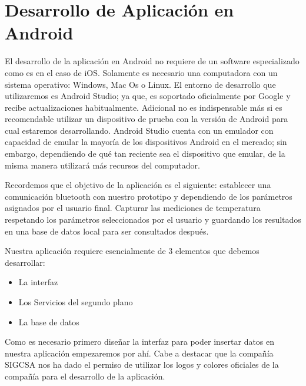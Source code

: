 \section{Desarrollo de Aplicación en Android}

\par 
El desarrollo de la aplicación en Android no requiere de un software especializado como es en el caso de iOS. Solamente es necesario una computadora con un sistema operativo: Windows, Mac Os o Linux. El entorno de desarrollo que utilizaremos es Android Studio; ya que, es soportado oficialmente por Google y recibe actualizaciones habitualmente. Adicional no es indispensable más si es recomendable utilizar un dispositivo de prueba con la versión de Android para cual estaremos desarrollando. Android Studio cuenta con un emulador con capacidad de emular la mayoría de los dispositivos Android en el mercado; sin embargo, dependiendo de qué tan reciente sea el dispositivo que emular, de la misma manera utilizará más recursos del computador.

\clearpage

\par \noindent
Recordemos que el objetivo de la aplicación es el siguiente: establecer una comunicación bluetooth con nuestro prototipo y dependiendo de los parámetros asignados por el usuario final. Capturar las mediciones de temperatura respetando los parámetros seleccionados por el usuario y guardando los resultados en una base de datos local para ser consultados después.

\par \noindent
Nuestra aplicación requiere esencialmente de 3 elementos que debemos desarrollar: 

\begin{itemize}
	\item La interfaz
	\item Los Servicios del segundo plano
	\item La base de datos
\end{itemize}

\par \noindent
Como es necesario primero diseñar la interfaz para poder insertar datos en nuestra aplicación empezaremos por ahí. Cabe a destacar que la compañía SIGCSA nos ha dado el permiso de utilizar los logos y colores oficiales de la compañía para el desarrollo de la aplicación.








